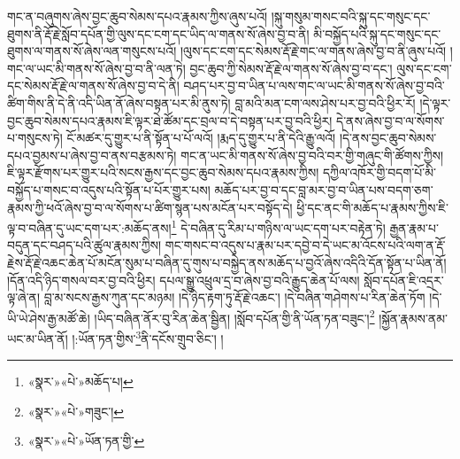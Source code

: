 གང་ན་བཞུགས་ཞེས་བྱང་ཆུབ་སེམས་དཔའ་རྣམས་ཀྱིས་ཞུས་པའོ། །སྐུ་གསུམ་གསང་བའི་སྐུ་དང་གསུང་དང་ཐུགས་ནི་རྡོ་རྗེ་སློབ་དཔོན་གྱི་ལུས་དང་ངག་དང་ཡིད་ལ་གནས་སོ་ཞེས་བྱ་བ་ནི། མི་བསྐྱོད་པའི་སྐུ་དང་གསུང་དང་ཐུགས་ལ་གནས་སོ་ཞེས་ལན་གསུངས་པའོ། །ལུས་དང་ངག་དང་སེམས་རྡོ་རྗེ་གང་ལ་གནས་ཞེས་བྱ་བ་ནི་ཞུས་པའོ། །གང་ལ་ཡང་མི་གནས་སོ་ཞེས་བྱ་བ་ནི་ལན་ཏེ། བྱང་ཆུབ་ཀྱི་སེམས་རྡོ་རྗེ་ལ་གནས་སོ་ཞེས་བྱ་བ་དང་། ལུས་དང་ངག་དང་སེམས་རྡོ་རྗེ་ལ་གནས་སོ་ཞེས་བྱ་བ་དེ་ནི། བཤད་པར་བྱ་བ་ཡིན་པ་ལས་གང་ལ་ཡང་མི་གནས་སོ་ཞེས་བྱ་བའི་ཚིག་གིས་ནི་དེ་ནི་འདི་ཡིན་ནོ་ཞེས་བསྟན་པར་མི་ནུས་ཏེ། བླ་མའི་མན་ངག་ལས་ཤེས་པར་བྱ་བའི་ཕྱིར་རོ། །དེ་ལྟར་བྱང་ཆུབ་སེམས་དཔའ་རྣམས་ཇི་ལྟར་ཐེ་ཚོམ་དང་བྲལ་བ་དེ་བསྟན་པར་བྱ་བའི་ཕྱིར། དེ་ནས་ཞེས་བྱ་བ་ལ་སོགས་པ་གསུངས་ཏེ། ངོ་མཚར་དུ་གྱུར་པ་ནི་སྟོན་པ་པོ་ལའོ། །རྨད་དུ་གྱུར་པ་ནི་དེའི་རྒྱུ་ལའོ། །དེ་ནས་བྱང་ཆུབ་སེམས་དཔའ་བྱམས་པ་ཞེས་བྱ་བ་ནས་བརྩམས་ཏེ། གང་ན་ཡང་མི་གནས་སོ་ཞེས་བྱ་བའི་བར་གྱི་གཞུང་གི་ཚོགས་ཀྱིས། ཇི་ལྟར་རྫོགས་པར་གྱུར་པའི་སངས་རྒྱས་དང་བྱང་ཆུབ་སེམས་དཔའ་རྣམས་ཀྱིས། དཀྱིལ་འཁོར་གྱི་བདག་པོ་མི་བསྐྱོད་པ་གསང་བ་འདུས་པའི་སྟོན་པ་པོར་གྱུར་པས། མཆོད་པར་བྱ་བ་དང་བླ་མར་བྱ་བ་ཡིན་པས་བདག་ཅག་རྣམས་ཀྱི་ཕའོ་ཞེས་བྱ་བ་ལ་སོགས་པ་ཚིག་སྙན་པས་མངོན་པར་བསྟོད་དེ། ཕྱི་དང་ནང་གི་མཆོད་པ་རྣམས་ཀྱིས་ཇི་ལྟ་བ་བཞིན་དུ་ཡང་དག་པར་:མཆོད་ནས།\footnote{«སྣར་»«པེ་»མཆོད་པ།} དེ་བཞིན་དུ་རིམ་པ་གཉིས་ལ་ཡང་དག་པར་བརྟེན་ཏེ། རྒྱན་རྣམ་པ་བདུན་དང་བཤད་པའི་ཚུལ་རྣམས་ཀྱིས། གང་གསང་བ་འདུས་པ་རྣམ་པར་དབྱེ་བ་དེ་ཡང་མ་འོངས་པའི་ལག་ན་རྡོ་རྗེས་རྡོ་རྗེ་འཆང་ཆེན་པོ་མངོན་སུམ་པ་བཞིན་དུ་གུས་པ་བསྐྱེད་ནས་མཆོད་པ་བྱའོ་ཞེས་འདིའི་དོན་སྟོན་པ་ཡིན་ནོ། །དོན་འདི་ཉིད་གསལ་བར་བྱ་བའི་ཕྱིར། དཔལ་སྒྱུ་འཕྲུལ་དྲ་བ་ཞེས་བྱ་བའི་རྒྱུད་ཆེན་པོ་ལས། སློབ་དཔོན་ཇི་འདྲར་ལྟ་ཞེ་ན། བླ་མ་སངས་རྒྱས་ཀུན་དང་མཉམ། །དེ་ཉིད་རྟག་ཏུ་རྡོ་རྗེ་འཆང་། །དེ་བཞིན་གཤེགས་པ་རིན་ཆེན་ཏོག །དེ་ཡི་ཡེ་ཤེས་རྒྱ་མཚོ་ཆེ། །ཡིད་བཞིན་ནོར་བུ་རིན་ཆེན་སྦྱིན། །སློབ་དཔོན་གྱི་ནི་ཡོན་ཏན་བཟུང་།\footnote{«སྣར་»«པེ་»གཟུང་།} །སྐྱོན་རྣམས་ནམ་ཡང་མ་ཡིན་ནོ། །:ཡོན་ཏན་གྱིས་\footnote{«སྣར་»«པེ་»ཡོན་ཏན་གྱི་}ནི་དངོས་གྲུབ་ཅིང་། །
